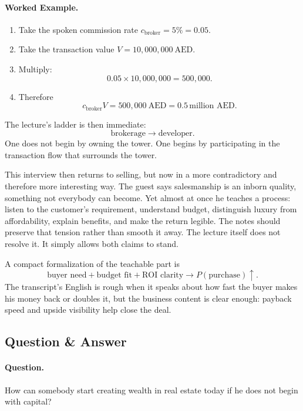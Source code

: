 \paragraph{Worked Example.}
\begin{enumerate}
\item Take the spoken commission rate \(c_{\text{broker}}=5\%=0.05\).
\item Take the transaction value \(V=10{,}000{,}000\ \text{AED}\).
\item Multiply:
\[
0.05 \times 10{,}000{,}000 = 500{,}000.
\]
\item Therefore
\[
c_{\text{broker}}V = 500{,}000\ \text{AED} = 0.5\,\text{million AED}.
\]
\end{enumerate}

The lecture's ladder is then immediate:
\begin{equation}
\text{brokerage} \to \text{developer}.
\end{equation}
One does not begin by owning the tower. One begins by participating in the transaction flow that surrounds the tower.

This interview then returns to selling, but now in a more contradictory and therefore more interesting way. The guest says salesmanship is an inborn quality, something not everybody can become. Yet almost at once he teaches a process: listen to the customer's requirement, understand budget, distinguish luxury from affordability, explain benefits, and make the return legible. The notes should preserve that tension rather than smooth it away. The lecture itself does not resolve it. It simply allows both claims to stand.

A compact formalization of the teachable part is
\begin{equation}
\text{buyer need} + \text{budget fit} + \text{ROI clarity}
\to
P(\text{purchase})\uparrow.
\end{equation}
The transcript's English is rough when it speaks about how fast the buyer makes his money back or doubles it, but the business content is clear enough: payback speed and upside visibility help close the deal.

\subsection{Question \& Answer}

\paragraph{Question.} How can somebody start creating wealth in real estate today if he does not begin with capital?

